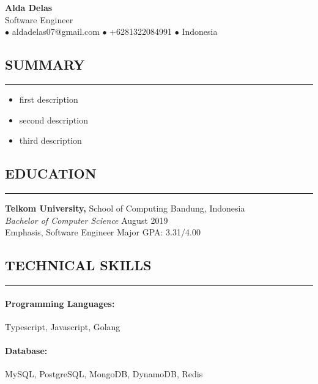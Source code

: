 \documentclass{article}
\begin{document}
{\centering
    {\LARGE \textbf{Alda Delas}} \\[0.2em]  %
    {\normalsize Software Engineer} \\[0.2em]           %
    {\normalsize $\bullet$ aldadelas07@gmail.com $\bullet$ +6281322084991 $\bullet$ Indonesia} \\[0.5em]        %
}

\subsection*{SUMMARY}
\vspace{-0.1em}
\hrule
\vspace{0.4em}

\begin{itemize}
    \setlength{\itemsep}{-0.3em}
    \item first description
    \item second description
    \item third description
\end{itemize}

\subsection*{EDUCATION}
\vspace{-0.1em}
\hrule
\vspace{0.4em}
{\bf Telkom University, }School of Computing \hfill Bandung, Indonesia \\
{\it Bachelor of Computer Science} \hfill August 2019 \\
Emphasis, Software Engineer \hfill Major GPA: 3.31/4.00

\subsection*{TECHNICAL SKILLS}
\vspace{-0.1em}
\hrule
\vspace{0.4em}
\paragraph{Programming Languages:} Typescript, Javascript, Golang
\vspace{-1.4em}
\paragraph{Database:} MySQL, PostgreSQL, MongoDB, DynamoDB, Redis
\vspace{-1.4em}
\end{document}

